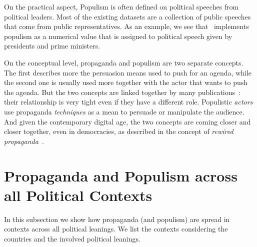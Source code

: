 On the practical aspect, Populism is often defined on political speeches from political leaders. Most of the existing datasets are a collection of public speeches that come from public representatives.
As an example, we see that~\citet{hawkins2019global} implements populism as a numerical value that is assigned to political speech given by presidents and prime ministers.


On the conceptual level, propaganda and populism are two separate concepts. The first describes more the persuasion means used to push for an agenda, while the second one is usually used more together with the actor that wants to push the agenda.
%
%
%
%
%
But the two concepts are linked together by many publications~\citet{tumber2021routledge,pasquino2008populism}: their relationship is very tight even if they have a different role. Populistic \emph{actors} use propaganda \emph{techniques} as a mean to persuade or manipulate the audience.
And given the contemporary digital age, the two concepts are coming closer and closer together, even in democracies, as described in the concept of \textit{rewired propaganda}~\citep{oates2021rewired}. %




\section{\statusgreen Propaganda and Populism across all Political Contexts}
\label{ssec:ps_prop_leaning_imbalanced_populism_across}

In this subsection we show how propaganda (and populism) are spread in contexts across all political leanings. We list the contexts considering the countries and the involved political leanings.

